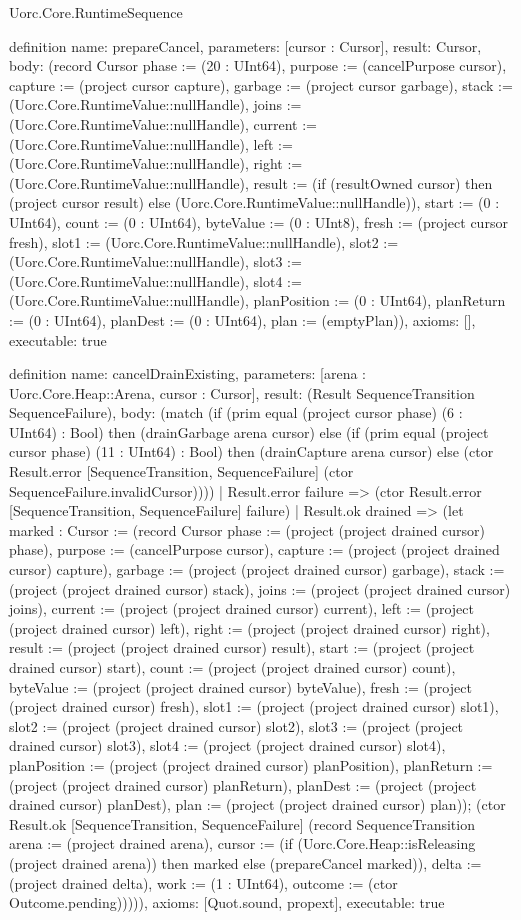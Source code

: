 \begin{lexlean}{Uorc.Core.RuntimeSequence}
\begin{semanticmodule}
definition{
  name: prepareCancel,
  parameters: [cursor : Cursor],
  result: Cursor,
  body: (record Cursor {phase := (20 : UInt64), purpose := (cancelPurpose cursor), capture := (project cursor capture), garbage := (project cursor garbage), stack := (Uorc.Core.RuntimeValue::nullHandle), joins := (Uorc.Core.RuntimeValue::nullHandle), current := (Uorc.Core.RuntimeValue::nullHandle), left := (Uorc.Core.RuntimeValue::nullHandle), right := (Uorc.Core.RuntimeValue::nullHandle), result := (if (resultOwned cursor) then (project cursor result) else (Uorc.Core.RuntimeValue::nullHandle)), start := (0 : UInt64), count := (0 : UInt64), byteValue := (0 : UInt8), fresh := (project cursor fresh), slot1 := (Uorc.Core.RuntimeValue::nullHandle), slot2 := (Uorc.Core.RuntimeValue::nullHandle), slot3 := (Uorc.Core.RuntimeValue::nullHandle), slot4 := (Uorc.Core.RuntimeValue::nullHandle), planPosition := (0 : UInt64), planReturn := (0 : UInt64), planDest := (0 : UInt64), plan := (emptyPlan)}),
  axioms: [],
  executable: true
}

definition{
  name: cancelDrainExisting,
  parameters: [arena : Uorc.Core.Heap::Arena, cursor : Cursor],
  result: (Result SequenceTransition SequenceFailure),
  body: (match (if (prim equal (project cursor phase) (6 : UInt64) : Bool) then (drainGarbage arena cursor) else (if (prim equal (project cursor phase) (11 : UInt64) : Bool) then (drainCapture arena cursor) else (ctor Result.error [SequenceTransition, SequenceFailure] (ctor SequenceFailure.invalidCursor))))
    | Result.error failure => (ctor Result.error [SequenceTransition, SequenceFailure] failure)
    | Result.ok drained => (let marked : Cursor := (record Cursor {phase := (project (project drained cursor) phase), purpose := (cancelPurpose cursor), capture := (project (project drained cursor) capture), garbage := (project (project drained cursor) garbage), stack := (project (project drained cursor) stack), joins := (project (project drained cursor) joins), current := (project (project drained cursor) current), left := (project (project drained cursor) left), right := (project (project drained cursor) right), result := (project (project drained cursor) result), start := (project (project drained cursor) start), count := (project (project drained cursor) count), byteValue := (project (project drained cursor) byteValue), fresh := (project (project drained cursor) fresh), slot1 := (project (project drained cursor) slot1), slot2 := (project (project drained cursor) slot2), slot3 := (project (project drained cursor) slot3), slot4 := (project (project drained cursor) slot4), planPosition := (project (project drained cursor) planPosition), planReturn := (project (project drained cursor) planReturn), planDest := (project (project drained cursor) planDest), plan := (project (project drained cursor) plan)}); (ctor Result.ok [SequenceTransition, SequenceFailure] (record SequenceTransition {arena := (project drained arena), cursor := (if (Uorc.Core.Heap::isReleasing (project drained arena)) then marked else (prepareCancel marked)), delta := (project drained delta), work := (1 : UInt64), outcome := (ctor Outcome.pending)})))),
  axioms: [Quot.sound, propext],
  executable: true
}


\end{semanticmodule}
\end{lexlean}

